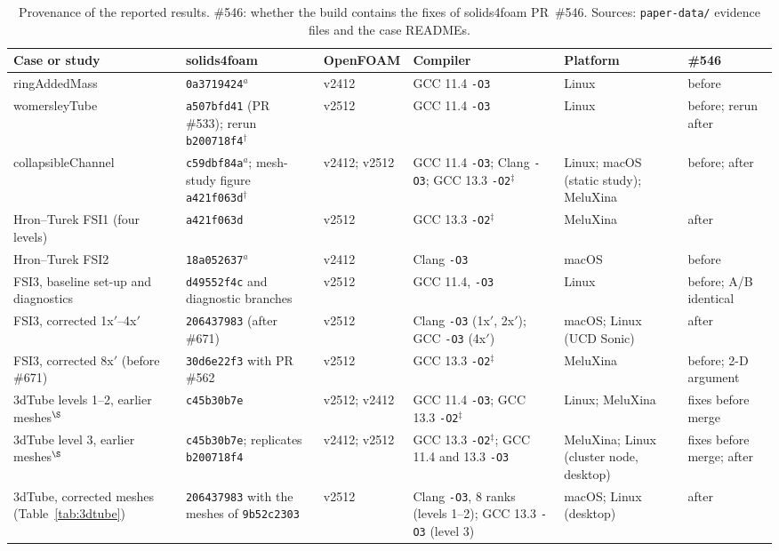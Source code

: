 \begin{table}[htbp]
	\centering
	\footnotesize
	\setlength{\tabcolsep}{3pt}
	\caption{Provenance of the reported results. \#546: whether the build contains the fixes of solids4foam PR~\#546. Sources: \texttt{paper-data/} evidence files and the case READMEs.}
	\label{tab:provenance}
	\begin{tabular}{p{2.9cm}p{2.5cm}p{1.5cm}p{2.4cm}p{1.8cm}p{2.1cm}}
		\toprule
		Case or study & solids4foam & OpenFOAM & Compiler & Platform & \#546 \\
		\midrule
		ringAddedMass & \texttt{0a3719424}$^a$ & v2412 & GCC 11.4 \texttt{-O3} & Linux & before \\
		womersleyTube & \texttt{a507bfd41} (PR \#533); rerun \texttt{b200718f4}$^\dagger$ & v2512 & GCC 11.4 \texttt{-O3} & Linux & before; rerun after \\
		collapsibleChannel & \texttt{c59dbf84a}$^a$; mesh-study figure \texttt{a421f063d}$^\dagger$ & v2412; v2512 & GCC 11.4 \texttt{-O3}; Clang \texttt{-O3}; GCC 13.3 \texttt{-O2}$^\ddagger$ & Linux; macOS (static study); MeluXina & before; after \\
		Hron--Turek FSI1 (four levels) & \texttt{a421f063d} & v2512 & GCC 13.3 \texttt{-O2}$^\ddagger$ & MeluXina & after \\
		Hron--Turek FSI2 & \texttt{18a052637}$^a$ & v2412 & Clang \texttt{-O3} & macOS & before \\
		FSI3, baseline set-up and diagnostics & \texttt{d49552f4c} and diagnostic branches & v2512 & GCC 11.4, \texttt{-O3} & Linux & before; A/B identical \\
		FSI3, corrected 1x$'$--4x$'$ & \texttt{206437983} (after \#671) & v2512 & Clang \texttt{-O3} (1x$'$, 2x$'$); GCC \texttt{-O3} (4x$'$) & macOS; Linux (UCD Sonic) & after \\
		FSI3, corrected 8x$'$ (before \#671) & \texttt{30d6e22f3} with PR \#562 & v2512 & GCC 13.3 \texttt{-O2}$^\ddagger$ & MeluXina & before; 2-D argument \\
		3dTube levels 1--2, earlier meshes$^\S$ & \texttt{c45b30b7e} & v2512; v2412 & GCC 11.4 \texttt{-O3}; GCC 13.3 \texttt{-O2}$^\ddagger$ & Linux; MeluXina & fixes before merge \\
		3dTube level 3, earlier meshes$^\S$ & \texttt{c45b30b7e}; replicates \texttt{b200718f4} & v2412; v2512 & GCC 13.3 \texttt{-O2}$^\ddagger$; GCC 11.4 and 13.3 \texttt{-O3} & MeluXina; Linux (cluster node, desktop) & fixes before merge; after \\
		3dTube, corrected meshes (Table~\ref{tab:3dtube}) & \texttt{206437983} with the meshes of \texttt{9b52c2303} & v2512 & Clang \texttt{-O3}, 8 ranks (levels 1--2); GCC 13.3 \texttt{-O3} (level 3) & macOS; Linux (desktop) & after \\

\end{tabular}
\end{table}
